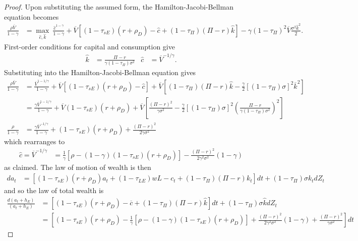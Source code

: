 \documentclass[11pt]{article}
\theoremstyle{plain}
\theoremstyle{definition} %
\begin{document}
\begin{proof}
Upon substituting the assumed form, the Hamilton-Jacobi-Bellman equation becomes 
\begin{align*}
\frac{\rho \overline{V}}{1-\gamma} & = \max_{\hat{c}, \hat{k}} \ \frac{\hat{c}^{1-\gamma}}{1-\gamma} + \overline{V}{\left[(1-\tau_{sE})(r+\rho_D) - \hat{c} + (1-\tau_{\Pi})(\Pi - r)\hat{k}\right]} - \gamma(1-\tau_{\Pi})^2\overline{V}\frac{\sigma^2\hat{k}^2}{2}.
\end{align*}
First-order conditions for capital and consumption give
\begin{align*}
\hat{k} & = \frac{\Pi - r}{ \gamma (1-\tau_{\Pi})\sigma^2} &
\hat{c} & = \overline{V}^{-1/\gamma}.
\end{align*}
Substituting into the Hamilton-Jacobi-Bellman equation gives 
\begin{align*}
\frac{\rho \overline{V}}{1-\gamma} & =  \frac{\overline{V}^{1-1/\gamma} }{1-\gamma} + \overline{V}{\left[(1-\tau_{sE})(r + \rho_D) - \hat{c} \right]} + \overline{V}{\left[ (1-\tau_{\Pi})(\Pi - r)\hat{k} - \frac{\gamma }{2} [(1-\tau_{\Pi})\sigma]^2\overline{k}^2\right]}
\\  & =  \frac{\gamma\overline{V}^{1-1/\gamma}}{1-\gamma} + \overline{V} (1-\tau_{sE})(r + \rho_D) + \overline{V}{\left[\frac{(\Pi-r)^2}{\gamma\sigma^2} - \frac{\gamma }{2} [(1-\tau_{\Pi})\sigma]^2{\left(\frac{\Pi-r}{\gamma (1-\tau_{\Pi})\sigma^2}\right)}^2\right]}
\\ \frac{\rho }{1-\gamma} & = \frac{\gamma\overline{V}^{-1/\gamma}}{1-\gamma} + (1-\tau_{sE})(r + \rho_D) + \frac{{\left(\Pi-r \right)}^2}{2\gamma\sigma^2} 
\end{align*}
which rearranges to 
\begin{align*}
\hat{c} = \overline{V}^{-1/\gamma} & = \frac{1}{\gamma} [\rho -  (1-\gamma)(1-\tau_{sE})(r+\rho_D)] - \frac{{\left(\Pi - r\right)}^2}{2\gamma^2\sigma^2} (1-\gamma)
\end{align*}
as claimed. The law of motion of wealth is then 
\begin{align*}
da_t & = {\left[(1-\tau_{sE})(r + \rho_D)a_t + (1-\tau_{LE})wL - c_t + (1 - \tau_{\Pi})(\Pi-r)k_t\right]}dt + (1-\tau_{\Pi})\sigma k_t dZ_t
\end{align*}
and so the law of total wealth is
\begin{align*}
\frac{d(a_t + h_E)}{(a_t + h_E)} & = {\left[(1-\tau_{sE})(r + \rho_D) - \overline{c} + (1-\tau_{\Pi})(\Pi - r)\hat{k}\right]}dt + (1-\tau_{\Pi})\sigma \hat{k} dZ_t
\\ & = {\left[(1-\tau_{sE})(r + \rho_D) - \frac{1}{\gamma} [\rho - (1-\gamma)(1-\tau_{sE})(r+\rho_D)] + \frac{{\left(\Pi-r\right)}^2}{2\gamma^2\sigma^2} (1-\gamma) + \frac{(\Pi-r)^2}{\gamma \sigma^2}\right]}dt 

\end{align*}
\end{proof}
\end{document}
